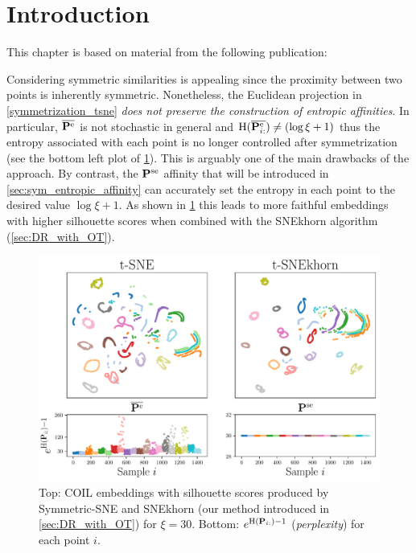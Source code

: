 
\section{Introduction}

This chapter is based on material from the following publication:

\begin{mdframed}
\begin{center} 
\end{center}
\end{mdframed}

Considering symmetric similarities is appealing since the proximity between two
points is inherently symmetric. Nonetheless, the Euclidean projection in
\eqref{symmetrization_tsne} \emph{does not preserve the construction of entropic
affinities}.  In particular, $\overline{\mathbf{P}^{\mathrm{e}}}$ is not stochastic in
general and $\operatorname{H}(\overline{\mathbf{P}_{i:}^{\mathrm{e}}}) \neq (\log{\xi} + 1)$ thus the entropy associated with each point is no longer controlled after symmetrization (see the bottom left plot of \cref{fig:coil}). This is
arguably one of the main drawbacks of the approach. By contrast, the
$\mathbf{P}^{\mathrm{se}}$ affinity that will be introduced in \cref{sec:sym_entropic_affinity} can
accurately set the entropy in each point to the desired value $\log \xi + 1$.  As shown in \cref{fig:coil} this leads to more faithful embeddings with higher silhouette scores when combined with the SNEkhorn algorithm (\cref{sec:DR_with_OT}).

\begin{figure}
    \centering
    \includegraphics[width=0.6\linewidth]{figures/SNEkhorn/fig_coil.pdf}
    \caption{Top: COIL \cite{nene1996columbia} embeddings with silhouette scores produced by Symmetric-SNE and SNEkhorn (our method introduced in  \cref{sec:DR_with_OT}) for $\xi=30$. Bottom: $e^{\operatorname{H}(\mathbf{P}_{i:})-1}$ (\emph{perplexity}) for each point $i$.}
    \label{fig:coil}
\end{figure}

